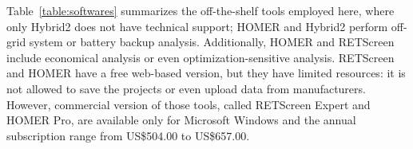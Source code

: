\documentclass[journal]{IEEEtran}
\begin{document}


Table~\ref{table:softwares} summarizes the off-the-shelf tools employed here, where only Hybrid2 does not have technical support; HOMER and Hybrid2 perform off-grid system or battery backup analysis. %
Additionally, HOMER and RETScreen include economical analysis or even optimization-sensitive analysis. RETScreen and HOMER have a free web-based version, but they have limited resources: it is not allowed to save the projects or even upload data from manufacturers. However, commercial version of those tools, called RETScreen Expert and HOMER Pro, are available only for Microsoft Windows and the annual subscription range from US\$504.00 to US\$657.00.
\end{document}
